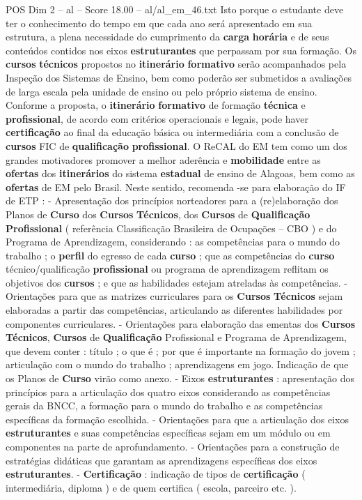 \begin{textsample}{POS Dim 2 – al – Score 18.00 – al/al\_em\_46.txt}
Isto porque o estudante deve ter o conhecimento do tempo em que cada ano será apresentado em sua estrutura, a plena necessidade do cumprimento da \textbf{carga} \textbf{horária} e de seus conteúdos contidos nos eixos \textbf{estruturantes} que perpassam por sua formação.
Os \textbf{cursos} \textbf{técnicos} propostos no \textbf{itinerário} \textbf{formativo} serão acompanhados pela Inspeção dos Sistemas de Ensino, bem como poderão ser submetidos a avaliações de larga escala pela unidade de ensino ou pelo próprio sistema de ensino.
Conforme a proposta, o \textbf{itinerário} \textbf{formativo} de formação \textbf{técnica} e \textbf{profissional}, de acordo com critérios operacionais e legais, pode haver \textbf{certificação} ao final da educação básica ou intermediária com a conclusão de \textbf{cursos} FIC de \textbf{qualificação} \textbf{profissional}.
O ReCAL do EM tem como um dos grandes motivadores promover a melhor aderência e \textbf{mobilidade} entre as \textbf{ofertas} dos \textbf{itinerários} do sistema \textbf{estadual} de ensino de Alagoas, bem como as \textbf{ofertas} de EM pelo Brasil.
Neste sentido, recomenda -se para elaboração do IF de ETP : - Apresentação dos princípios norteadores para a (re)elaboração dos Planos de \textbf{Curso} dos \textbf{Cursos} \textbf{Técnicos}, dos \textbf{Cursos} de \textbf{Qualificação} \textbf{Profissional} ( referência Classificação Brasileira de Ocupações – CBO ) e do Programa de Aprendizagem, considerando : as competências para o mundo do trabalho ; o \textbf{perfil} do egresso de cada \textbf{curso} ; que as competências do \textbf{curso} técnico/qualificação \textbf{profissional} ou programa de aprendizagem reflitam os objetivos dos \textbf{cursos} ; e que as habilidades estejam atreladas às competências. - Orientações para que as matrizes curriculares para os \textbf{Cursos} \textbf{Técnicos} sejam elaboradas a partir das competências, articulando as diferentes habilidades por componentes curriculares. - Orientações para elaboração das ementas dos \textbf{Cursos} \textbf{Técnicos}, \textbf{Cursos} de \textbf{Qualificação} Profissional e Programa de Aprendizagem, que devem conter : título ; o que é ; por que é importante na formação do jovem ; articulação com o mundo do trabalho ; aprendizagens em jogo.
Indicação de que os Planos de \textbf{Curso} virão como anexo. - Eixos \textbf{estruturantes} : apresentação dos princípios para a articulação dos quatro eixos considerando as competências gerais da BNCC, a formação para o mundo do trabalho e as competências específicas da formação escolhida. - Orientações para que a articulação dos eixos \textbf{estruturantes} e suas competências específicas sejam em um módulo ou em componentes na parte de aprofundamento. - Orientações para a construção de estratégias didáticas que garantam as aprendizagens específicas dos eixos \textbf{estruturantes}. - \textbf{Certificação} : indicação de tipos de \textbf{certificação} ( intermediária, diploma ) e de quem certifica ( escola, parceiro etc. ).

\end{textsample}

